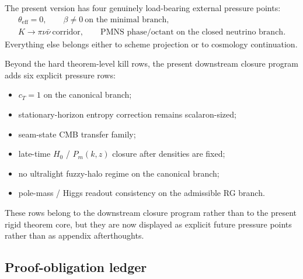\begin{tcolorbox}[colback=blue!2, colframe=blue!50!black, breakable,
    title={Hard kill rows of the present version}, colbacktitle=blue!60!black]
The present version has four genuinely load-bearing external pressure points:
\[
\begin{aligned}
\theta_{\mathrm{eff}}=0,
\qquad
\beta\neq 0\ \text{on the minimal branch},\\
K\to\pi\nu\bar\nu\ \text{corridor},
\qquad
\text{PMNS phase/octant on the closed neutrino branch}.
\end{aligned}
\]
Everything else belongs either to scheme projection or to cosmology continuation.
\end{tcolorbox}

\begin{tcolorbox}[colback=blue!2, colframe=blue!40!black, breakable,
    title={Downstream pressure rows of the present version}, colbacktitle=blue!55!black]
Beyond the hard theorem-level kill rows, the present downstream closure program adds six explicit
pressure rows:
\begin{itemize}[leftmargin=1.5em, topsep=3pt, itemsep=2pt]
    \item $c_T=1$ on the canonical branch;
    \item stationary-horizon entropy correction remains scalaron-sized;
    \item seam-state CMB transfer family;
    \item late-time $H_0$ / $P_m(k,z)$ closure after densities are fixed;
    \item no ultralight fuzzy-halo regime on the canonical branch;
    \item pole-mass / Higgs readout consistency on the admissible RG branch.
\end{itemize}
These rows belong to the downstream closure program rather than to the present rigid theorem core,
but they are now displayed as explicit future pressure points rather than as appendix afterthoughts.
\end{tcolorbox}

\subsection{Proof-obligation ledger}

